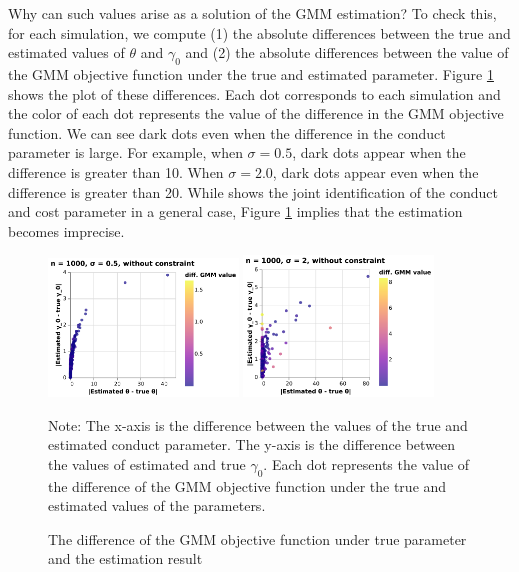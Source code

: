 \documentclass[11pt, a4paper]{article}
\begin{document}
Why can such values arise as a solution of the GMM estimation?
To check this, for each simulation, we compute (1) the absolute differences between the true and estimated values of $\theta$ and $\gamma_0$ and (2) the absolute differences between the value of the GMM objective function under the true and estimated parameter.
Figure \ref{fg:diff_gmm_loglinear_loglinear} shows the plot of these differences. 
Each dot corresponds to each simulation and the color of each dot represents the value of the difference in the GMM objective function. 
We can see dark dots even when the difference in the conduct parameter is large.
For example, when $\sigma = 0.5$, dark dots appear when the difference is greater than 10.
When $\sigma = 2.0$, dark dots appear even when the difference is greater than 20.
While \citet{lau1982identifying} shows the joint identification of the conduct and cost parameter in a general case, Figure \ref{fg:diff_gmm_loglinear_loglinear} implies that the estimation becomes imprecise.


\begin{figure}[!htbp]
  \begin{center}
  \includegraphics[width = 0.45\textwidth]
  {figuretable/diff_gmm_value_loglinear_loglinear_n_1000_sigma_0.5_non_constraint.pdf}
  \includegraphics[width = 0.45\textwidth]
  {figuretable/diff_gmm_value_loglinear_loglinear_n_1000_sigma_2_non_constraint.pdf}
  \caption{The difference of the GMM objective function under true parameter and the estimation result}
  \label{fg:diff_gmm_loglinear_loglinear} 
  \end{center}
  \footnotesize
  Note: The x-axis is the difference between the values of the true and estimated conduct parameter. The y-axis is the difference between the values of estimated and true $\gamma_0$. Each dot represents the value of the difference of the GMM objective function under the true and estimated values of the parameters. 
\end{figure} 
\end{document}
